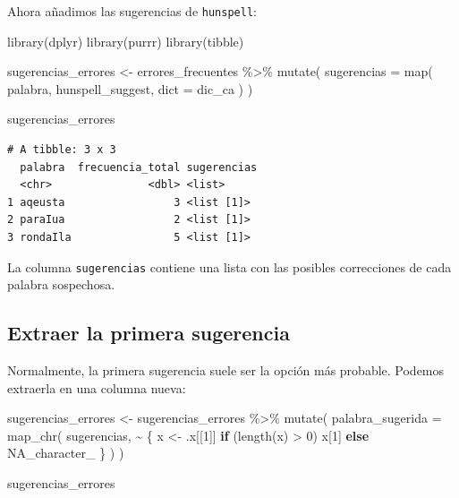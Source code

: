 \documentclass[
  letterpaper,
  DIV=11,
  numbers=noendperiod]{scrreprt}
\newenvironment{Shaded}{\begin{snugshade}}{\end{snugshade}}
\newcommand{\AttributeTok}[1]{\textcolor[rgb]{0.40,0.45,0.13}{#1}}
\newcommand{\ConstantTok}[1]{\textcolor[rgb]{0.56,0.35,0.01}{#1}}
\newcommand{\ControlFlowTok}[1]{\textcolor[rgb]{0.00,0.23,0.31}{\textbf{#1}}}
\newcommand{\DecValTok}[1]{\textcolor[rgb]{0.68,0.00,0.00}{#1}}
\newcommand{\FunctionTok}[1]{\textcolor[rgb]{0.28,0.35,0.67}{#1}}
\newcommand{\NormalTok}[1]{\textcolor[rgb]{0.00,0.23,0.31}{#1}}
\newcommand{\OtherTok}[1]{\textcolor[rgb]{0.00,0.23,0.31}{#1}}
\newcommand{\SpecialCharTok}[1]{\textcolor[rgb]{0.37,0.37,0.37}{#1}}
\begin{document}
Ahora añadimos las sugerencias de \texttt{hunspell}:

\begin{Shaded}
\begin{Highlighting}[]
\FunctionTok{library}\NormalTok{(dplyr)}
\FunctionTok{library}\NormalTok{(purrr)}
\FunctionTok{library}\NormalTok{(tibble)}

\NormalTok{sugerencias\_errores }\OtherTok{\textless{}{-}}\NormalTok{ errores\_frecuentes }\SpecialCharTok{\%\textgreater{}\%}
  \FunctionTok{mutate}\NormalTok{(}
    \AttributeTok{sugerencias =} \FunctionTok{map}\NormalTok{(}
\NormalTok{      palabra,}
\NormalTok{      hunspell\_suggest,}
      \AttributeTok{dict =}\NormalTok{ dic\_ca}
\NormalTok{    )}
\NormalTok{  )}

\NormalTok{sugerencias\_errores}
\end{Highlighting}
\end{Shaded}

\begin{verbatim}
# A tibble: 3 x 3
  palabra  frecuencia_total sugerencias
  <chr>               <dbl> <list>     
1 aqeusta                 3 <list [1]> 
2 paraIua                 2 <list [1]> 
3 rondaIla                5 <list [1]> 
\end{verbatim}

La columna \texttt{sugerencias} contiene una lista con las posibles
correcciones de cada palabra sospechosa.

\subsection{Extraer la primera
sugerencia}\label{extraer-la-primera-sugerencia}

Normalmente, la primera sugerencia suele ser la opción más probable.
Podemos extraerla en una columna nueva:

\begin{Shaded}
\begin{Highlighting}[]
\NormalTok{sugerencias\_errores }\OtherTok{\textless{}{-}}\NormalTok{ sugerencias\_errores }\SpecialCharTok{\%\textgreater{}\%}
  \FunctionTok{mutate}\NormalTok{(}
    \AttributeTok{palabra\_sugerida =} \FunctionTok{map\_chr}\NormalTok{(}
\NormalTok{      sugerencias,}
      \SpecialCharTok{\textasciitilde{}}\NormalTok{ \{}
\NormalTok{        x }\OtherTok{\textless{}{-}}\NormalTok{ .x[[}\DecValTok{1}\NormalTok{]]}
        \ControlFlowTok{if}\NormalTok{ (}\FunctionTok{length}\NormalTok{(x) }\SpecialCharTok{\textgreater{}} \DecValTok{0}\NormalTok{) x[}\DecValTok{1}\NormalTok{] }\ControlFlowTok{else} \ConstantTok{NA\_character\_}
\NormalTok{      \}}
\NormalTok{    )}
\NormalTok{  )}

\NormalTok{sugerencias\_errores}
\end{Highlighting}
\end{Shaded}
\end{document}
